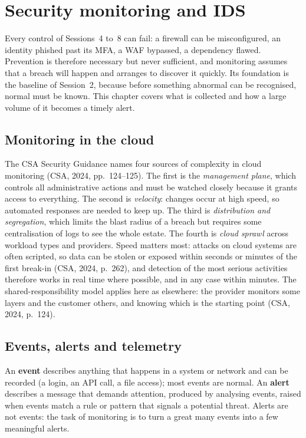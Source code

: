 \chapter{Security monitoring and IDS}

Every control of Sessions~4 to~8 can fail: a firewall can be misconfigured,
an identity phished past its MFA, a WAF bypassed, a dependency flawed.
Prevention is therefore necessary but never sufficient, and monitoring
assumes that a breach will happen and arranges to discover it quickly. Its
foundation is the baseline of Session~2, because before something abnormal
can be recognised, normal must be known. This chapter covers what is
collected and how a large volume of it becomes a timely alert.

\section{Monitoring in the cloud}

The CSA Security Guidance names four sources of complexity in cloud
monitoring (CSA, 2024, pp.~124--125). The first is the \emph{management
plane}, which controls all administrative actions and must be watched
closely because it grants access to everything. The second is
\emph{velocity}: changes occur at high speed, so automated responses are
needed to keep up. The third is \emph{distribution and segregation}, which
limits the blast radius of a breach but requires some centralisation of logs
to see the whole estate. The fourth is \emph{cloud sprawl} across workload
types and providers. Speed matters most: attacks on cloud systems are often
scripted, so data can be stolen or exposed within seconds or minutes of the
first break-in (CSA, 2024, p.~262), and detection of the most serious
activities therefore works in real time where possible, and in any case
within minutes. The shared-responsibility model applies here as elsewhere:
the provider monitors some layers and the customer others, and knowing which
is the starting point (CSA, 2024, p.~124).

\section{Events, alerts and telemetry}

\begin{definition}\label{def:event}
An \textbf{event} describes anything that happens in a system or network and
can be recorded (a login, an API call, a file access); most events are normal.
An \textbf{alert} describes a message that demands attention, produced by
analysing events, raised when events match a rule or pattern that signals a potential
threat. Alerts are not events: the task of monitoring is to turn a great many
events into a few meaningful alerts.
\end{definition}

